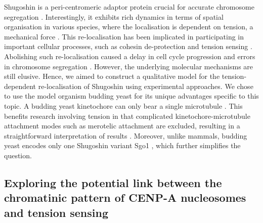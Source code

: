 Shugoshin is a peri-centromeric adaptor protein crucial for accurate chromosome segregation \citep{Marston2015, Zhang2020FunctioningMitosis}. Interestingly, it exhibits rich dynamics in terms of spatial organisation in various species, where the localisation is dependent on tension, a mechanical force \citep{Huang2007, Liu2013, Asai2020, Lee2008, Gomez2007, Eshleman2014, Nerusheva2014, Paldi2020ConvergentPericentromeres, Clarke2005, Kawashima2007}. This re-localisation has been implicated in participating in important cellular processes, such as cohesin de-protection and tension sensing \citep{Indjeian2005a, Nerusheva2014, Su2021SumoylationAnaphase, Lee2008, Liu2013}. Abolishing such re-localisation caused a delay in cell cycle progression and errors in chromosome segregation \citep{Su2021SumoylationAnaphase, Liu2013}. However, the underlying molecular mechanisms are still elusive. Hence, we aimed to construct a qualitative model for the tension-dependent re-localisation of Shugoshin using experimental approaches. We chose to use the model organism budding yeast for its unique advantages specific to this topic. A budding yeast kinetochore can only bear a single microtubule \citep{Biggins2013TheKinetochore}. This benefits research involving tension in that complicated kinetochore-microtubule attachment modes such as merotelic attachment are excluded, resulting in a straightforward interpretation of results \citep{Tanaka2010Kinetochore-microtubuleBi-orientation}. Moreover, unlike mammals, budding yeast encodes only one Shugoshin variant Sgo1 \citep{Marston2015}, which further simplifies the question. 

\subsection{Exploring the potential link between the chromatinic pattern of CENP-A nucleosomes and tension sensing}

